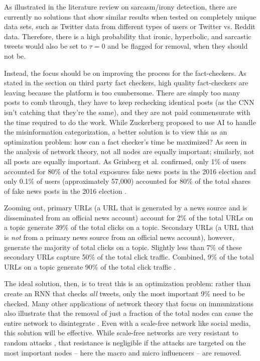 \documentclass[NETN,manuscript]{stjour-new}
\begin{document}
 As illustrated in the literature review on sarcasm/irony detection, there are currently no solutions that show similar results when tested on completely unique data sets, such as Twitter data from different types of users or Twitter vs. Reddit data. Therefore, there is a high probability that ironic, hyperbolic, and sarcastic tweets would also be set to $\tau = 0$ and be flagged for removal, when they should not be. 
 
 Instead, the focus should be on improving the process for the fact-checkers. As stated in the section on third party fact checkers, high quality fact-checkers are leaving because the platform is too cumbersome. There are simply too many posts to comb through, they have to keep rechecking identical posts (as the CNN isn't catching that they're the same), and they are not paid commensurate with the time required to do the work. While Zuckerberg proposed to use AI to handle the misinformation categorization, a better solution is to view this as an optimization problem: how can a fact checker's time be maximized? As seen in the analysis of network theory, not all nodes are equally important; similarly, not all posts are equally important. As Grinberg et al. confirmed, only 1\% of users accounted for 80\% of the total exposures fake news posts in the 2016 election and only 0.1\% of users (approximately 57,000) accounted for 80\% of the total shares of fake news posts in the 2016 election  \citep{grinberg2019fake}. 
 
 Zooming out, primary URLs (a URL that is generated by a news source and is disseminated from an official news account) account for 2\% of the total URLs on a topic generate 39\% of the total clicks on a topic. Secondary URLs (a URL that is \textit{not} from a primary news source from an official news account), however, generate the majority of total clicks on a topic. Slightly less than 7\% of these secondary URLs capture 50\% of the total click traffic. Combined, 9\% of the total URLs on a topic generate 90\% of the total click traffic \citep{gabielkov2016social}. 
 
 The ideal solution, then, is to treat this is an optimization problem: rather than create an RNN that checks \textit{all} tweets, only the most important 9\% need to be checked. Many other applications of network theory that focus on immunizations also illustrate that the removal of just a fraction of the total nodes can cause the entire network to disintegrate \citep{albert2000error,cohen2003efficient,helleringer2007sexual,cohen2001breakdown}. Even with a scale-free network like social media, this solution will be effective. While scale-free networks are very resistant to random attacks \citep{albert2000error,callaway2000network,cohen2000resilience}, that resistance is negligible if the attacks are targeted on the most important nodes -- here the macro and micro influencers -- are removed.
 
\end{document}
